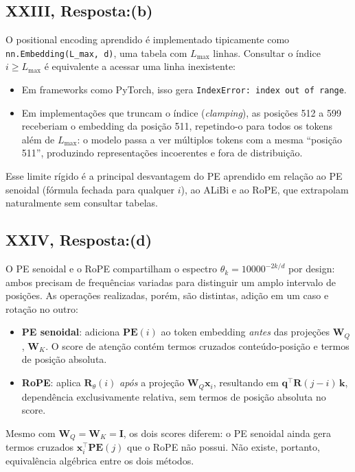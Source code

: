 \documentclass{dlproblemset}
\begin{document}
\subsection*{XXIII, Resposta:(b)}
O positional encoding aprendido é implementado tipicamente como
\texttt{nn.Embedding(L\_max, d)}, uma tabela com $L_{\max}$ linhas.
Consultar o índice $i \geq L_{\max}$ é equivalente a acessar uma linha inexistente:
\begin{itemize}
  \item Em frameworks como PyTorch, isso gera \texttt{IndexError: index out of range}.
  \item Em implementações que truncam o índice (\textit{clamping}), as posições 512
        a 599 receberiam o embedding da posição 511, repetindo-o para todos os tokens
        além de $L_{\max}$: o modelo passa a ver múltiplos tokens com a mesma
        ``posição 511'', produzindo representações incoerentes e fora de distribuição.
\end{itemize}
Esse limite rígido é a principal desvantagem do PE aprendido em relação ao PE
senoidal (fórmula fechada para qualquer $i$), ao ALiBi e ao RoPE, que extrapolam
naturalmente sem consultar tabelas.

\subsection*{XXIV, Resposta:(d)}
O PE senoidal e o RoPE compartilham o espectro $\theta_k = 10000^{-2k/d}$ por
design: ambos precisam de frequências variadas para distinguir um amplo intervalo
de posições. As operações realizadas, porém, são distintas, adição em um caso e rotação no outro:
\begin{itemize}
  \item \textbf{PE senoidal}: adiciona $\mathbf{PE}(i)$ ao token embedding
        \emph{antes} das projeções $\mathbf{W}_Q$, $\mathbf{W}_K$. O score de atenção contém termos
        cruzados conteúdo-posição e termos de posição absoluta.
  \item \textbf{RoPE}: aplica $\mathbf{R}_\theta(i)$ \emph{após} a projeção $\mathbf{W}_Q\mathbf{x}_i$,
        resultando em $\mathbf{q}^\top \mathbf{R}(j-i)\,\mathbf{k}$, dependência
        exclusivamente relativa, sem termos de posição absoluta no score.
\end{itemize}
Mesmo com $\mathbf{W}_Q = \mathbf{W}_K = \mathbf{I}$, os dois scores diferem: o PE senoidal ainda gera termos
cruzados $\mathbf{x}_i^\top\mathbf{PE}(j)$ que o RoPE não possui. Não existe,
portanto, equivalência algébrica entre os dois métodos.
\end{document}
